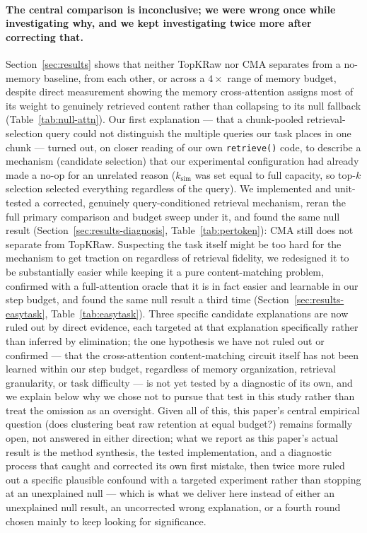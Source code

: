 \documentclass[11pt]{article}
\begin{document}
\paragraph{The central comparison is inconclusive; we were wrong once while investigating why, and
we kept investigating twice more after correcting that.} Section~\ref{sec:results} shows that
neither TopKRaw nor CMA separates from a no-memory baseline, from each other, or across a
$4\times$ range of memory budget, despite direct measurement showing the memory cross-attention
assigns most of its weight to genuinely retrieved content rather than collapsing to its null
fallback (Table~\ref{tab:null-attn}). Our first explanation --- that a chunk-pooled
retrieval-selection query could not distinguish the multiple queries our task places in one chunk
--- turned out, on closer reading of our own \texttt{retrieve()} code, to describe a mechanism
(candidate selection) that our experimental configuration had already made a no-op for an
unrelated reason ($k_{\text{sim}}$ was set equal to full capacity, so top-$k$ selection selected
everything regardless of the query). We implemented and unit-tested a corrected, genuinely
query-conditioned retrieval mechanism, reran the full primary comparison and budget sweep under it,
and found the same null result (Section~\ref{sec:results-diagnosis}, Table~\ref{tab:pertoken}):
CMA still does not separate from TopKRaw. Suspecting the task itself might be too hard for the
mechanism to get traction on regardless of retrieval fidelity, we redesigned it to be substantially
easier while keeping it a pure content-matching problem, confirmed with a full-attention oracle
that it is in fact easier and learnable in our step budget, and found the same null result a third
time (Section~\ref{sec:results-easytask}, Table~\ref{tab:easytask}). Three specific candidate
explanations are now ruled out by direct evidence, each targeted at that explanation specifically
rather than inferred by elimination; the one hypothesis we have not ruled out or confirmed ---
that the cross-attention content-matching circuit itself has not been learned within our step
budget, regardless of memory organization, retrieval granularity, or task difficulty --- is not
yet tested by a diagnostic of its own, and we explain below why we chose not to pursue that test
in this study rather than treat the omission as an oversight. Given all of this, this paper's
central empirical question (does clustering beat raw retention at equal budget?) remains formally
open, not answered in either direction; what we report as this paper's actual result is the method
synthesis, the tested implementation, and a diagnostic process that caught and corrected its own
first mistake, then twice more ruled out a specific plausible confound with a targeted experiment
rather than stopping at an unexplained null --- which is what we deliver here instead of either an
unexplained null result, an uncorrected wrong explanation, or a fourth round chosen mainly to keep
looking for significance.
\end{document}
